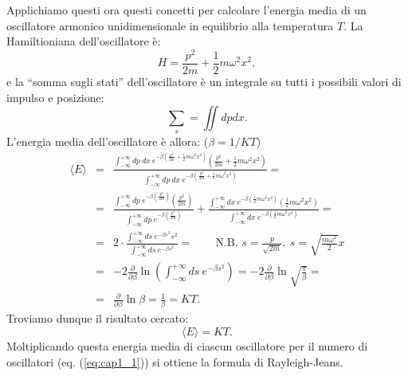 Applichiamo questi ora questi concetti per calcolare l'energia media di un oscillatore armonico unidimensionale in equilibrio alla temperatura $T$. La Hamiltioniana dell'oscillatore è:
	\begin{equation}
		H= \frac{p^2}{2m}+\frac{1}{2}m \omega ^2 x^2 , 
	\end{equation}
e la ``somma sugli stati'' dell'oscillatore è un integrale su tutti i possibili valori di impulso e posizione:
	\begin{equation}
		\sum _s = \iint dp dx .
	\end{equation}
L'energia media dell'oscillatore è allora: ($\beta = 1/KT$)
	\begin{eqnarray}
		\langle E \rangle &=& \frac{\int _{-\infty} ^{+\infty} dp\ dx \ e^{-\beta \left( \frac{p^2}{2m}+\frac{1}{2}m \omega ^2x^2\right)}\left( \frac{p^2}{2m}+\frac{1}{2}m \omega ^2x^2\right)}{\int _{-\infty} ^{+\infty} dp\ dx\ e^{-\beta \left( \frac{p^2}{2m}+\frac{1}{2}m \omega ^2x^2\right)}}= \nonumber \\
		&=&\frac{\int _{-\infty} ^{+\infty} dp \ e^{-\beta \left( \frac{p^2}{2m}\right)}\left( \frac{p^2}{2m}\right)}{\int _{-\infty} ^{+\infty} dp \  e^{-\beta \left( \frac{p^2}{2m}\right)}} + \frac{\int _{-\infty} ^{+\infty}  dx \  e^{-\beta \left(\frac{1}{2}m \omega ^2x^2\right)}\left(\frac{1}{2}m \omega ^2x^2\right)}{\int _{-\infty} ^{+\infty} dx\ e^{-\beta \left( \frac{1}{2}m \omega ^2x^2\right)}}= \nonumber \\
		&=& 2\cdot \frac{\int _{-\infty} ^{+\infty}ds \  e^{-\beta s^2}s^2}{\int _{-\infty} ^{+\infty}ds \  e^{-\beta s^2}}= \qquad \scriptstyle{\textrm{N.B. } s=\frac{p}{\sqrt{2m}}, \ s= \sqrt{\frac{m \omega ^2}{2}}x}\nonumber \\
		&=&-2 \frac{\partial}{\partial \beta} \ln \left(\int _{-\infty} ^{+\infty}ds \  e^{-\beta s^2} \right) = -2\frac{\partial}{\partial \beta} \ln \sqrt{\frac{\pi}{\beta}}= \nonumber \\
	&=& \frac{\partial}{\partial \beta} \ln \beta = \frac{1}{\beta}= KT. 
	\end{eqnarray}
Troviamo dunque il risultato cercato:
	\begin{equation}
	\boxed{
			\langle E \rangle = KT.
	}
	\label{eq:cap1_2}
\end{equation}
Moltiplicando questa energia media di ciascun oscillatore per il numero di oscillatori (eq. (\ref{eq:cap1_1})) si ottiene la formula di Rayleigh-Jeans.\\

